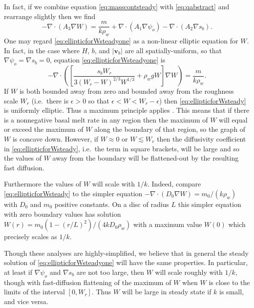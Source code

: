 \documentclass[gmd]{copernicus}   %
\newcommand\bv{\mathbf{v}}
\newcommand{\Div}{\nabla\cdot}
\newcommand\eps{\epsilon}
\newcommand{\grad}{\nabla}
\begin{document}
In fact, if we combine equation \eqref{eq:masscontsteady} with \eqref{eq:qabstract} and rearrange slightly then we find
\begin{equation}
-\Div \left(A_3 \grad W\right) = \frac{m}{k \rho_w} + \Div \left(A_1 \grad \psi_o\right) - \Div \left(A_2 \grad s_b\right).  \label{eq:ellipticforWsteadyone}
\end{equation}
One may regard \eqref{eq:ellipticforWsteadyone} as a non-linear elliptic equation for $W$.  In fact, in the case where $H$, $b$, and $|\bv_b|$ are all spatially-uniform, so that $\grad \psi_o = \grad s_b = 0$, equation \eqref{eq:ellipticforWsteadyone} is
\small
\begin{equation}
-\Div \left(\left[\frac{s_b W_r}{3 (W_r - W)^{2/3} W^{1/3}} + \rho_w g W\right] \grad W\right) = \frac{m}{k \rho_w}.  \label{eq:ellipticforWsteady}
\end{equation}
\normalsize
If $W$ is both bounded away from zero and bounded away from the roughness scale $W_r$ (i.e.~there is $\eps>0$ so that $\eps < W < W_r-\eps$) then \eqref{eq:ellipticforWsteady} is uniformly elliptic.  Thus a maximum principle applies \citep{Evans}.  This means that if there is a nonnegative basal melt rate in any region then the maximum of $W$ will equal or exceed the maximum of $W$ along the boundary of that region, so the graph of $W$ is concave down.  However, if $W\approx 0$  or $W\lesssim W_r$ then the diffusivity coefficient in \eqref{eq:ellipticforWsteady}, i.e.~the term in square brackets, will be large and so the values of $W$ away from the boundary will be flattened-out by the resulting fast diffusion.

Furthermore the values of $W$ will scale with $1/k$.  Indeed, compare \eqref{eq:ellipticforWsteady} to the simpler equation $-\Div \left(D_0 \grad W\right) = m_0/(k \rho_w)$ with $D_0$ and $m_0$ positive constants.  On a disc of radius $L$ this simpler equation with zero boundary values has solution $W(r) = m_0 (1-(r/L)^2) / (4 k D_0 \rho_w)$ with a maximum value $W(0)$ which precisely scales as $1/k$.

Though these analyses are highly-simplified, we believe that in general the steady solution of \eqref{eq:ellipticforWsteadyone} will have the same properties.  In particular, at least if $\grad \psi_o$ and $\grad s_b$ are not too large, then $W$ will scale roughly with $1/k$, though with fast-diffusion flattening of the maximum of $W$ when $W$ is close to the limits of the interval $[0,W_r]$.  Thus $W$ will be large in steady state if $k$ is small, and vice versa.
\end{document}
